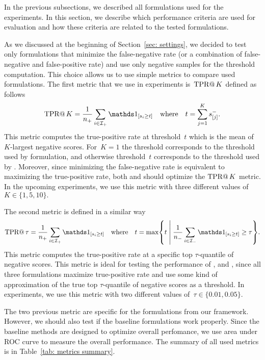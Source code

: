 In the previous subsections, we described all formulations used for the experiments. In this section, we describe which performance criteria are used for evaluation and how these criteria are related to the tested formulations.

As we discussed at the beginning of Section~\ref{sec: settings}, we decided to test only formulations that minimize the false-negative rate (or a combination of false-negative and false-positive rate) and use only negative samples for the threshold computation. This choice allows us to use simple metrics to compare used formulations. The first metric that we use in experiments is~$\operatorname{TPR@}K$ defined as follows
\begin{equation*}
  \tpratk = \frac{1}{\npos} \sum_{i \in \Ipos} \Iverson{s_i \geq t} \quad \text{where} \quad t = \sum_{j = 1}^{K} s^{-}_{[j]}.
\end{equation*}
This metric computes the true-positive rate at threshold~$t$ which is the mean of $K$-largest negative scores. For~$K = 1$ the threshold corresponds to the threshold used by \TopPush formulation, and otherwise threshold~$t$ corresponds to the threshold used by \TopPushK. Moreover, since minimizing the false-negative rate is equivalent to maximizing the true-positive rate, both \TopPush and \TopPushK should optimize the $\operatorname{TPR@}K$ metric. In the upcoming experiments, we use this metric with three different values of~$K \in \{1, 5, 10\}.$

The second metric is defined in a similar way
\begin{equation*}
  \tpratfpr = \frac{1}{\npos} \sum_{i \in \Ipos} \Iverson{s_i \geq t} \quad \text{where} \quad t
  = \max \Set{t}{\frac{1}{\nneg} \sum_{i \in \Ineg} \Iverson{s_i \geq t} \geq \tau}.
\end{equation*}
This metric computes the true-positive rate at a specific top $\tau$-quantile of negative scores. This metric is ideal for testing the performance of \Grill, \tauFPL and \PatMatNP, since all three formulations maximize true-positive rate and use some kind of approximation of the true top $\tau$-quantile of negative scores as a threshold. In experiments, we use this metric with two different values of~$\tau \in \{0.01, 0.05\}.$ 

The two previous metric are specific for the formulations from our framework. However, we should also test if the baseline formulations work properly. Since the baseline methods are designed to optimize overall perfomance, we use area under ROC curve to measure the overall performance. The summary of all used metrics is in Table~\ref{tab: metrics summary}.

